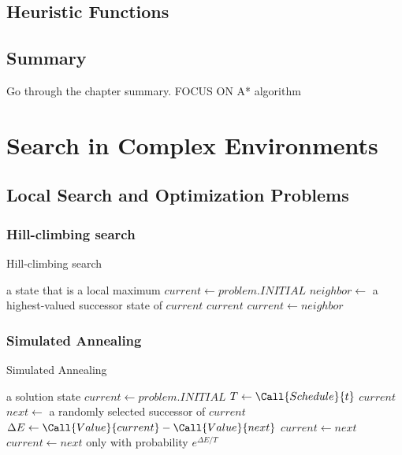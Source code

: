 \documentclass[exam={Midterm}]{cs581exam}
\begin{document}
\subsection{Heuristic Functions}\label{subsec:3.6}
\subsection{Summary}\label{subsec:3-summary}
Go through the chapter summary. FOCUS ON A* algorithm

\section{Search in Complex Environments}\label{sec:search-in-complex-environments}
\subsection{Local Search and Optimization Problems}\label{subsec:local-search-and-optimization-problems}
\subsubsection{Hill-climbing search}\label{subsubsec:4.1.1}
\begin{algorithm}[H]
	\caption{Hill-climbing search}\label{alg:hill-climbing}
	\begin{algorithmic}[1]
	 \Returns a state that is a local maximum
		\State $current\gets problem.INITIAL$
			\State $neighbor\gets$ a highest-valued successor state of $current$
				\Return $current$
			\EndIf
			\State $current\gets neighbor$
		\EndWhile
	\EndFunction
	\end{algorithmic}
\end{algorithm}

\subsubsection{Simulated Annealing}\label{subsubsec:4.1.2}
\begin{algorithm}[H]
	\caption{Simulated Annealing}\label{alg:simulated-annealing}
	\begin{algorithmic}[1]
	 \Returns a solution state
		\State $current\gets problem.INITIAL$
			\State $T\gets\Call{Schedule}{t}$
				\Return $current$
			\EndIf
			\State $next\gets$ a randomly selected successor of $current$
			\State $\Delta E\gets\Call{Value}{current} - \Call{Value}{next}$
				$current\gets next$
			\Else\
				$current\gets next$ only with probability $e^{\Delta E/T}$
			\EndIf
		\EndFor
	\EndFunction
	\end{algorithmic}
\end{algorithm}
\end{document}
